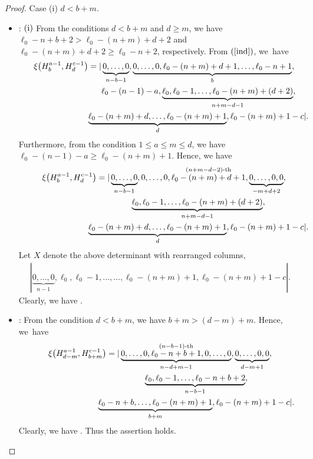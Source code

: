 \documentclass[10pt,a4paper]{amsart}
\numberwithin{equation}{section}
\begin{document}
\begin{proof}
Case (i) $d<b+m$.
\begin{itemize}
\item {}: $({\rm i})$ From the conditions $d< b+m$ and $d\geq m$, we have $\ell_{0}-n+b+2>\ell_{0}-(n+m)+d+2$ and $\ell_{0}-(n+m)+d+2\geq \ell_{0}-n+2$, respectively. %
From $(\ref{ind})$, we~have
\begin{gather*}
\xi\bigl(H^{a-1}_{b},H^{c-1}_{d}\bigr)=|\underbrace{0,\dots,0}_{n-b-1},\underbrace{0,\dots,0,\ell_0-(n+m)+d+1,\dots,\ell_{0}-n+1}_{b},\nonumber\\
\hphantom{\xi\bigl(H^{a-1}_{b},H^{c-1}_{d}\bigr)=|}{}
\,\ell_{0}-(n-1)-a,\underbrace{\ell_{0},\ell_{0}-1,\dots,\ell_{0}-(n+m)+(d+2)}_{n+m-d-1},\nonumber\\
\hphantom{\xi\bigl(H^{a-1}_{b},H^{c-1}_{d}\bigr)=|}{}
\underbrace{\ell_{0}-(n+m)+d,\dots,\ell_{0}-(n+m)+1}_{d},\ell_{0}-(n+m)+1-c|.%
\end{gather*}
Furthermore, from the condition $1\leq a\leq m\leq d$, we have $\ell_{0}-(n-1)-a\geq \ell_{0}-(n+m)+1$. Hence, we have
\begin{gather*}
\xi\bigl(H^{a-1}_{b},H^{c-1}_{d}\bigr)=|\underbrace{0,\dots,0}_{n-b-1},
0,\dots,0,\stackrel{(n+m-d-2)\text{-th}}{\ell_0-(n+m)+d+1},\underbrace{0,\dots,0,0}_{-m+d+2},\nonumber\\
\hphantom{\xi\bigl(H^{a-1}_{b},H^{c-1}_{d}\bigr)=|}{}
\underbrace{\ell_{0},\ell_{0}-1,\dots,\ell_{0}-(n+m)+(d+2)}_{n+m-d-1},\nonumber\\
\hphantom{\xi\bigl(H^{a-1}_{b},H^{c-1}_{d}\bigr)=|}{}
\underbrace{\ell_{0}-(n+m)+d,\dots,\ell_{0}-(n+m)+1}_{d},\ell_{0}-(n+m)+1-c|.%
\end{gather*}
Let $X$ denote the above determinant with rearranged columns,
\begin{gather*}
| \underbrace{0,\dots,0}_{n-1},\ell_{0},\ell_{0}-1,\dots,
\dots,\ell_{0}-(n+m)+1,\ell_{0}-(n+m)+1-c|.
\end{gather*}
Clearly, we have .

\item {}: From the condition $d< b+m$, we have $b+m>(d-m)+m$. Hence, we~have
\begin{gather*}
\xi\bigl(H^{a-1}_{d-m},H^{c-1}_{b+m}\bigr)=|\underbrace{0,\dots,0,\stackrel{(n-b-1)\text{-th}}{\ell_{0}-n+b+1}, 0,\dots,0}_{n-d+m-1},%
\underbrace{0,\dots,0,0}_{d-m+1},\\
\hphantom{\xi\bigl(H^{a-1}_{d-m},H^{c-1}_{b+m}\bigr)=|}{}
\underbrace{\ell_{0},\ell_{0}-1,\dots,\ell_{0}-n+b+2}_{n-b-1},\\
\hphantom{\xi\bigl(H^{a-1}_{d-m},H^{c-1}_{b+m}\bigr)=|}{}
\underbrace{\ell_{0}-n+b,\dots,\ell_{0}-(n+m)+1}_{b+m},\ell_{0}-(n+m)+1-c|.%
\end{gather*}
Clearly, we have . Thus the assertion holds.
\end{itemize}


\end{proof}
\end{document}
